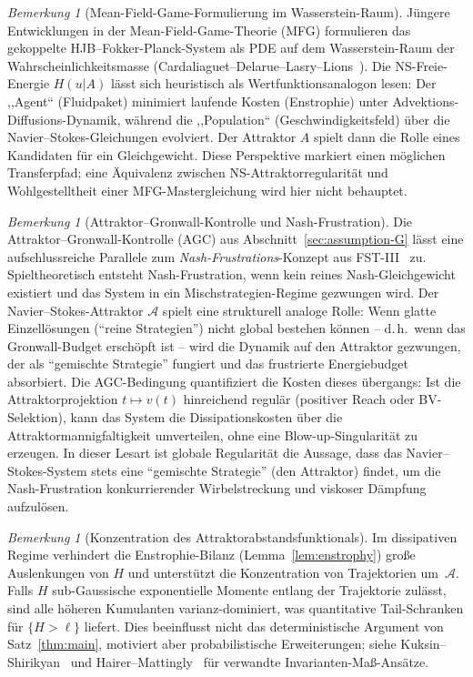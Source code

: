 \documentclass[12pt,a4paper]{article}
\theoremstyle{definition}
\theoremstyle{plain}
\theoremstyle{remark}
\newtheorem{remark}[definition]{Bemerkung}
\begin{document}
\begin{remark}[Mean-Field-Game-Formulierung im Wasserstein-Raum]
\label{rem:mfg-wasserstein}
Jüngere Entwicklungen in der Mean-Field-Game-Theorie (MFG) formulieren das gekoppelte HJB--Fokker-Planck-System als PDE auf dem Wasserstein-Raum der Wahrscheinlichkeitsmasse (Cardaliaguet--Delarue--Lasry--Lions~\cite{CDLL2019}). Die NS-Freie-Energie $H(u|A)$ lässt sich heuristisch als Wertfunktionsanalogon lesen: Der ,,Agent`` (Fluidpaket) minimiert laufende Kosten (Enstrophie) unter Advektions-Diffusions-Dynamik, während die ,,Population`` (Geschwindigkeitsfeld) über die Navier--Stokes-Gleichungen evolviert. Der Attraktor $A$ spielt dann die Rolle eines Kandidaten für ein Gleichgewicht. Diese Perspektive markiert einen möglichen Transferpfad; eine Äquivalenz zwischen NS-Attraktorregularität und Wohlgestelltheit einer MFG-Mastergleichung wird hier nicht behauptet.
\end{remark}

\begin{remark}[Attraktor--Gronwall-Kontrolle und Nash-Frustration]
\label{rem:agc-nash-frustration}
Die Attraktor--Gronwall-Kontrolle (AGC) aus
Abschnitt~\ref{sec:assumption-G} lässt eine aufschlussreiche Parallele
zum \emph{Nash-Frustrations}-Konzept aus FST-III~\cite{FST-Unified2026}
zu. Spieltheoretisch entsteht Nash-Frustration, wenn kein reines
Nash-Gleichgewicht existiert und das System in ein
Mischstrategien-Regime gezwungen wird.
Der Navier--Stokes-Attraktor $\mathcal{A}$ spielt eine strukturell
analoge Rolle: Wenn glatte Einzellösungen (``reine Strategien'')
nicht global bestehen können -- d.\,h.\ wenn das Gronwall-Budget
erschöpft ist -- wird die Dynamik auf den Attraktor gezwungen, der
als ``gemischte Strategie'' fungiert und das frustrierte Energiebudget
absorbiert. Die AGC-Bedingung quantifiziert die Kosten dieses
übergangs: Ist die Attraktorprojektion $t \mapsto v(t)$ hinreichend
regulär (positiver Reach oder BV-Selektion), kann das System die
Dissipationskosten über die Attraktormannigfaltigkeit umverteilen,
ohne eine Blow-up-Singularität zu erzeugen. In dieser Lesart ist
globale Regularität die Aussage, dass das Navier--Stokes-System
stets eine ``gemischte Strategie'' (den Attraktor) findet, um die
Nash-Frustration konkurrierender Wirbelstreckung und viskoser
Dämpfung aufzulösen.
\end{remark}

\begin{remark}[Konzentration des Attraktorabstandsfunktionals]
\label{rem:cumulants}
Im dissipativen Regime verhindert die Enstrophie-Bilanz
(Lemma~\ref{lem:enstrophy}) große Auslenkungen von $H$ und
unterstützt die Konzentration von Trajektorien um~$\mathcal{A}$.
Falls $H$ sub-Gaussische exponentielle Momente entlang der Trajektorie zulässt,
sind alle höheren Kumulanten varianz-dominiert, was quantitative
Tail-Schranken für $\{H > \ell\}$ liefert. Dies beeinflusst nicht das deterministische
Argument von Satz~\ref{thm:main}, motiviert aber probabilistische
Erweiterungen; siehe
Kuksin--Shirikyan~\cite{KuksinShirikyan2012} und
Hairer--Mattingly~\cite{HairerMattingly2006} für verwandte Invarianten-Maß-Ansätze.
\end{remark}
\end{document}
